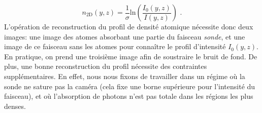 \begin{equation}
n_{\mathrm{2D}}(y,z)= \frac{1}{\sigma} \mathrm{ln}\left( \frac{I_0(y,z)}{I(y,z)} \right) \text{ .}
\end{equation}
L'opération de reconstruction du profil de densité atomique nécessite donc deux images: une image des atomes absorbant une partie du faisceau \emph{sonde}, et une image de ce faisceau sans les atomes pour connaître le profil d'intensité $I_0(y,z)$. En pratique, on prend une troisième image afin de soustraire le bruit de fond. De plus, une bonne reconstruction du profil nécessite des contraintes supplémentaires. En effet, nous nous fixons de travailler dans un régime où la sonde ne sature pas la caméra (cela fixe une borne supérieure pour l'intensité du faisceau), et où l'absorption de photons n'est pas totale dans les régions les plus denses.



